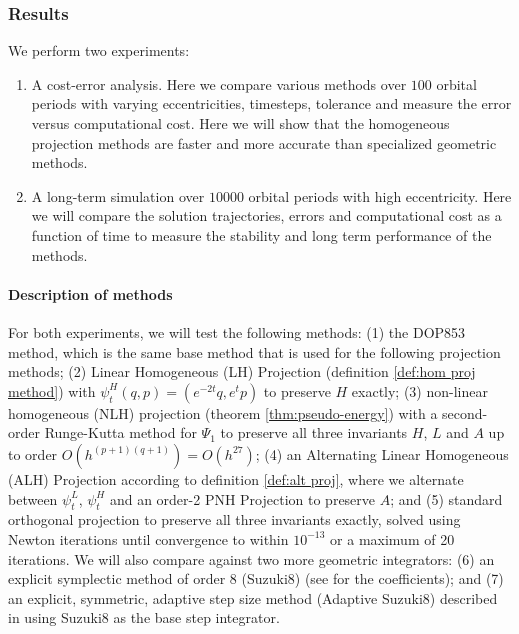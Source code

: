 \documentclass[final,3p,times]{elsarticle}
\begin{document}
\subsubsection{Results}
 
We perform two experiments: 
\begin{enumerate}
  \item A cost-error analysis. Here we compare various methods over $100$ orbital periods with varying eccentricities, timesteps, tolerance and measure the error versus computational cost. Here we will show that the homogeneous projection methods are faster and more accurate than specialized geometric methods. 
  \item A long-term simulation over $10000$ orbital periods with high eccentricity. Here we will compare the solution trajectories, errors and computational cost as a function of time to measure the stability and long term performance of the methods.
\end{enumerate}

\paragraph{Description of methods} For both experiments, we will test the following methods: (1) the DOP853 method, which is the same base method that is used for the following projection methods; (2) Linear Homogeneous (LH) Projection (definition \ref{def:hom proj method}) with $\psi^H_t(q, p)=(e^{-2t}q, e^{t}p)$ to preserve $H$ exactly; (3) non-linear homogeneous (NLH) projection (theorem \ref{thm:pseudo-energy}) with a second-order Runge-Kutta method for $\Psi_1$ to preserve all three invariants $H$, $L$ and $A$ up to order $O(h^{(p+1)(q+1)})=O(h^{27})$; (4) an Alternating Linear Homogeneous (ALH) Projection according to definition \ref{def:alt proj}, where we alternate between $\psi^L_t$, $\psi^H_t$ and an order-2 PNH Projection to preserve $A$; and (5) standard orthogonal projection to preserve all three invariants exactly, solved using Newton iterations until convergence to within $10^{-13}$ or a maximum of 20 iterations. We will also compare against two more geometric integrators: (6) an explicit symplectic method of order 8 (Suzuki8) (see \cite{hairer2006geometric} for the coefficients); and (7) an explicit, symmetric, adaptive step size method (Adaptive Suzuki8) described in \cite{hairer2005explicit} using Suzuki8 as the base step integrator.
\end{document}
